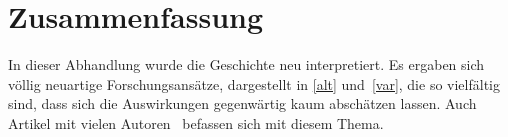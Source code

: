 \documentclass[ngerman]{seminarbeitrag}
\begin{document}
\section{Zusammenfassung}

In dieser Abhandlung wurde die Geschichte neu interpretiert.
Es ergaben sich völlig neuartige Forschungsansätze, dargestellt in \cref{alt} und~\ref{var},
die so vielfältig sind, dass sich die Auswirkungen gegen\-wärtig %
kaum abschätzen lassen. Auch Artikel mit vielen Autoren~\cite{Black1988}
befassen sich mit diesem Thema.


%
%


\end{document}
